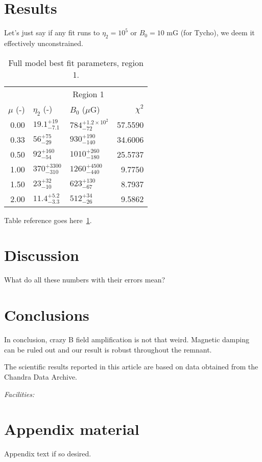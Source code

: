 \documentclass[manuscript]{aastex}  %
\begin{document}

\section{Results}

Let's just say if any fit runs to $\eta_2 = 10^5$ or $B_0 = 10$ mG (for Tycho),
we deem it effectively unconstrained.

\begin{table}
\caption{Full model best fit parameters, region 1.\label{tab:fit1}}
\begin{tabular}{@{}rllr@{}}
\toprule
{} & \multicolumn{3}{c}{Region 1} \\
\cmidrule(l){2-4}
$\mu$ (-) & $\eta_2$ (-) & $B_0$ ($\mu$G) & $\chi^2$\\
\midrule
0.00 & ${19.1}^{+19}_{-7.1}$ & ${784}^{+1.2 \times 10^{2}}_{-72}$ & 57.5590\\
0.33 & ${56}^{+75}_{-29}$ & $930^{+190}_{-140}$ & 34.6006\\
0.50 & ${92}^{+160}_{-54}$ & ${1010}^{+260}_{-180}$ & 25.5737\\
1.00 & ${370}^{+3300}_{-310}$ & ${1260}^{+4500}_{-440}$ & 9.7750\\
1.50 & ${23}^{+32}_{-10}$ & ${623}^{+130}_{-67}$ & 8.7937\\
2.00 & ${11.4}^{+5.2}_{-3.3}$ & ${512}^{+34}_{-26}$ & 9.5862\\
\bottomrule
\end{tabular} 
\end{table}

Table reference goes here~\ref{tab:fit1}.

\section{Discussion}

What do all these numbers with their errors mean?


\section{Conclusions}

In conclusion, crazy B field amplification is not that weird.  Magnetic damping
can be ruled out and our result is robust throughout the remnant.

\acknowledgments

The scientific results reported in this article are based on data obtained from
the Chandra Data Archive.

{\it Facilities:} 

\appendix

\section{Appendix material}

Appendix text if so desired.


\end{document}
